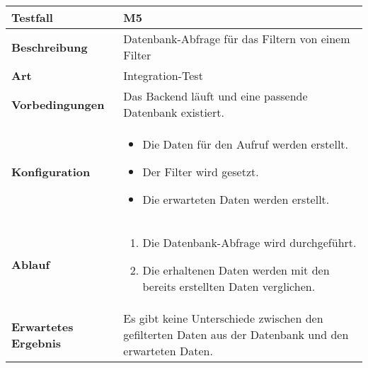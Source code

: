 \begin{longtable}{p{}|p{}}
	\hline
	\textbf{Testfall}               & \textbf{M5} \\
	\hline
	\textbf{Beschreibung}   		& Datenbank-Abfrage für das Filtern von einem Filter \\
	\hline
	\textbf{Art}    				& Integration-Test \\
	\hline
	\textbf{Vorbedingungen}    		& Das Backend läuft und eine passende Datenbank existiert. \\
	\hline
	\textbf{Konfiguration}   	 	& 
	\begin{itemize}
		\item Die Daten für den Aufruf werden erstellt.
		\item Der Filter wird gesetzt.
		\item Die erwarteten Daten werden erstellt.
	\end{itemize} \\
	\hline
	\textbf{Ablauf}    				& 
	\begin{enumerate}
		\item Die Datenbank-Abfrage wird durchgeführt.
		\item Die erhaltenen Daten werden mit den bereits erstellten Daten verglichen.
	\end{enumerate} \\
	\hline
	\textbf{Erwartetes Ergebnis}    & Es gibt keine Unterschiede zwischen den gefilterten Daten aus der Datenbank und den erwarteten Daten. \\
	\hline
\end{longtable}\label{tab:testfall-M5}

